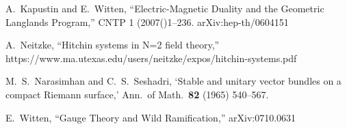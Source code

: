 \documentclass[oneside,english]{amsbook}
\numberwithin{section}{chapter}
\numberwithin{equation}{section}
\numberwithin{figure}{section}
\theoremstyle{plain}
\theoremstyle{definition}
\theoremstyle{remark}
\theoremstyle{definition}
\theoremstyle{definition}
\theoremstyle{plain}
\begin{document}
\begin{thebibliography}{BNR}
A.~Kapustin and E.~Witten, ``Electric-Magnetic
Duality and the Geometric Langlands Program,'' CNTP 1 (2007()1--236.
arXiv:hep-th/0604151

A.~Neitzke, ``Hitchin systems in N=2 field theory,''
https://www.ma.utexas.edu/users/neitzke/expos/hitchin-systems.pdf 

M.~S.~Narasimhan and C.~S.~Seshadri, `Stable
and unitary vector bundles on a compact Riemann surface,' Ann.~of
Math.~\textbf{82} (1965) 540--567.

E.~Witten, ``Gauge Theory and Wild Ramification,''
arXiv:0710.0631\end{thebibliography}
\end{document}
